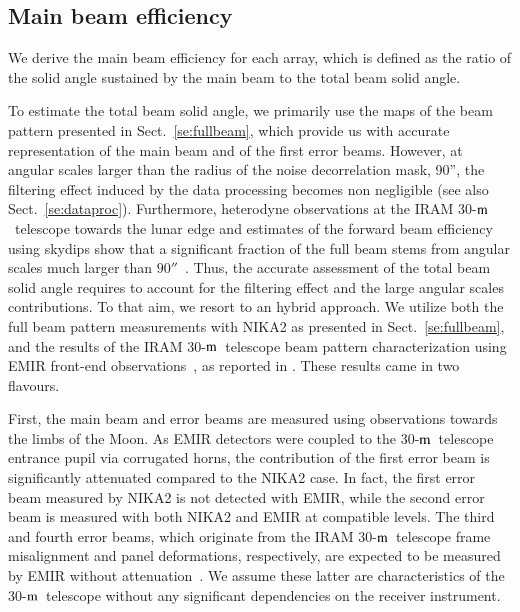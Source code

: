 \documentclass[traditionalabstract]{aa}
\newcommand{\trentemetre}{30-$\rm{m}$}
\newcommand{\rev}[1]{#1}
\begin{document}

\subsection{Main beam efficiency}
\label{se:beam_efficiency}

We derive the main beam efficiency for each array, which is defined as the
ratio of the solid angle sustained by the main beam to the total beam
solid angle.

{\rev To estimate the total beam solid angle, we primarily use the maps
of the beam pattern presented in Sect.~\ref{se:fullbeam}, which
provide us with accurate representation of the main beam and of the
first error beams. However, at angular scales larger than the radius
of the noise decorrelation mask, 90'', the
filtering effect induced by the data processing becomes
non negligible (see also Sect.~\ref{se:dataproc}). Furthermore,
heterodyne observations at the IRAM \trentemetre\ telescope
towards the lunar edge and estimates of the forward beam efficiency using
skydips show that a significant fraction of the full beam stems
from angular scales much larger than $90''$~\citep{Greve1998,
Kramer2013}. Thus, the accurate assessment of the total beam solid
angle requires to account for the filtering effect and the large
angular scales contributions. To that aim, we resort to an hybrid
approach. We utilize both the full beam pattern measurements with
NIKA2 as presented in Sect.~\ref{se:fullbeam}, and the results of the
IRAM \trentemetre\ telescope beam pattern characterization using EMIR
front-end observations~\citep{Carter2012}, as reported
in \citet{Kramer2013}. These results came in two flavours.}

{\rev First, the main beam and error beams are measured using
observations towards the limbs of the Moon. As EMIR detectors were coupled to
the \trentemetre\ telescope entrance pupil via corrugated horns, the
contribution of the first error beam is significantly attenuated
compared to the NIKA2 case. In fact, the first error beam measured by
NIKA2 is not detected with EMIR, while the second error beam is
measured with both NIKA2 and EMIR at compatible levels. The third and
fourth error beams, which originate from the IRAM \trentemetre\
telescope frame misalignment and panel deformations, respectively, are
expected to be measured by EMIR without
attenuation~\citep{Kramer2013}. We assume these latter are
characteristics of the \trentemetre\ telescope without any significant
dependencies on the receiver instrument.}
\end{document}
